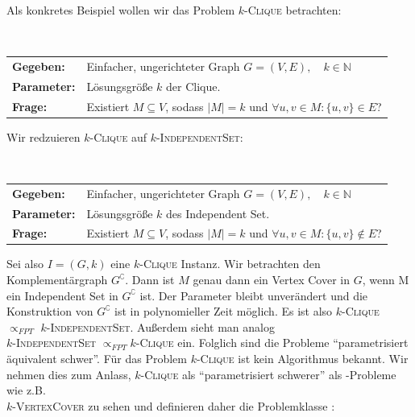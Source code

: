 \documentclass[a4paper,ngerman]{atseminar}
\newcommand{\N}{\ensuremath{\mathbb{N}}\xspace}
\begin{document}
\noindent
Als konkretes Beispiel wollen wir das Problem $k$-\textsc{Clique} betrachten:

\begin{definition}
  $ $\newline
  \begin{tabular}{ll}
    \textbf{Gegeben:} & Einfacher, ungerichteter Graph  $G = (V, E), \quad k \in \N$ \\
    \textbf{Parameter:} & Lösungsgröße $k$ der Clique. \\
    \textbf{Frage:} & Existiert $M \subseteq V$, sodass $ |M| = k $ und $ \forall u, v \in M : \{u, v\} \in E$?
  \end{tabular}
\end{definition}

\noindent
Wir redzuieren $k$-\textsc{Clique} auf $k$-\textsc{IndependentSet}:

\begin{definition}
  $ $\newline
  \begin{tabular}{ll}
    \textbf{Gegeben:} & Einfacher, ungerichteter Graph  $G = (V, E), \quad k \in \N$ \\
    \textbf{Parameter:} & Lösungsgröße $k$ des Independent Set. \\
    \textbf{Frage:} & Existiert $M \subseteq V$, sodass $ |M| = k $ und $ \forall u, v \in M : \{u, v\} \not\in E$?
  \end{tabular}
\end{definition}

\noindent
Sei also $I = (G, k)$ eine $k$-\textsc{Clique} Instanz. Wir betrachten den Komplementärgraph $G^\complement$.
Dann ist $M$ genau dann ein Vertex Cover in $G$, wenn M ein Independent Set in $G^\complement$ ist.
Der Parameter bleibt unverändert und die Konstruktion von $G^\complement$ ist in polynomieller Zeit möglich. 
Es ist also $k$-\textsc{Clique} $\propto_{FPT}$ $k$-\textsc{IndependentSet}. Außerdem sieht man analog \\$k$-\textsc{IndependentSet} $\propto_{FPT} k$-\textsc{Clique} ein.
Folglich sind die Probleme \enquote{parametrisiert äquivalent schwer}.
Für das Problem $k$-\textsc{Clique} ist kein \FPT\xspace Algorithmus bekannt. Wir nehmen dies zum Anlass, $k$-\textsc{Clique} als \enquote{parametrisiert schwerer} als
\FPT-Probleme wie z.B.\\ $k$-\textsc{VertexCover} zu sehen und definieren daher die Problemklasse \W[1]:
\end{document}
